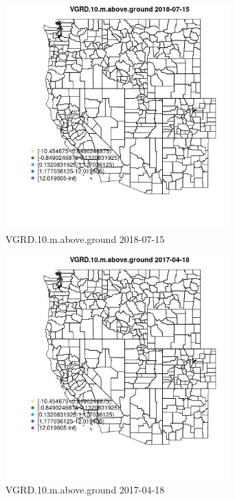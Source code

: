\begin{figure} 
\centering  
\includegraphics[width=0.77\textwidth]{Code_Outputs/Report_ML_input_PM25_Step4_part_e_de_duplicated_aveswNAs_MapObsVGRD10maboveground2018-07-15.jpg} 
\caption{\label{fig:Report_ML_input_PM25_Step4_part_e_de_duplicated_aveswNAsMapObsVGRD10maboveground2018-07-15}VGRD.10.m.above.ground 2018-07-15} 
\end{figure} 
 

\begin{figure} 
\centering  
\includegraphics[width=0.77\textwidth]{Code_Outputs/Report_ML_input_PM25_Step4_part_e_de_duplicated_aveswNAs_MapObsVGRD10maboveground2017-04-18.jpg} 
\caption{\label{fig:Report_ML_input_PM25_Step4_part_e_de_duplicated_aveswNAsMapObsVGRD10maboveground2017-04-18}VGRD.10.m.above.ground 2017-04-18} 
\end{figure} 
 

